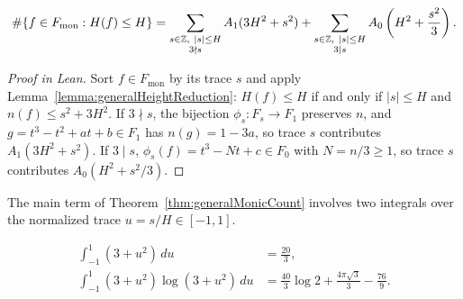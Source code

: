 \begin{equationnode}

\label{eqn:generalTraceDecomposition}


\leanok



\begin{align*} \#\{f\in F_{\mathrm{mon}}:H(f)\leq H\} =\sum_{\substack{s\in\ZZ,\ |s|\leq H\\3\nmid s}} A_1(3H^2+s^2) +\sum_{\substack{s\in\ZZ,\ |s|\leq H\\3\mid s}} A_0\left(H^2+\frac{s^2}{3}\right).  \end{align*}

\end{equationnode}

\begin{proof}[Proof in Lean]

\leanok


Sort $f\in F_{\mathrm{mon}}$ by its trace $s$ and apply Lemma~\ref{lemma:generalHeightReduction}: $H(f)\leq H$ if and only if $|s|\leq H$ and $n(f)\leq s^2+3H^2$. If $3\nmid s$, the bijection $\phi_s:F_s\to F_1$ preserves $n$, and $g=t^3-t^2+at+b\in F_1$ has $n(g)=1-3a$, so trace $s$ contributes $A_1(3H^2+s^2)$. If $3\mid s$, $\phi_s(f)=t^3-Nt+c\in F_0$ with $N=n/3\geq1$, so trace $s$ contributes $A_0(H^2+s^2/3)$.

\end{proof}

\begin{equationnode}

\label{eqn:monicArchimedeanMoments}


\leanok

The main term of Theorem~\ref{thm:generalMonicCount} involves two integrals over the normalized trace $u=s/H\in[-1,1]$.

\begin{equation*} \begin{aligned} \int_{-1}^1(3+u^2)\,du&=\frac{20}{3},\\ \int_{-1}^1(3+u^2)\log(3+u^2)\,du &=\frac{40}{3}\log2+\frac{4\pi\sqrt3}{3}-\frac{76}{9}. \end{aligned} \end{equation*}

\end{equationnode}

